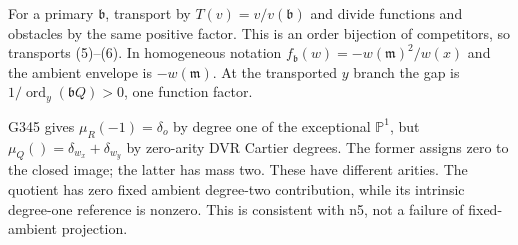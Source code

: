 For a primary $\mathfrak b$, transport by $T(v)=v/v(\mathfrak b)$ and divide functions and obstacles by the same positive factor. This is an order bijection of competitors, so transports (5)--(6). In homogeneous notation $f_{\mathfrak b}(w)=-w(\mathfrak m)^2/w(x)$ and the ambient envelope is $-w(\mathfrak m)$. At the transported $y$ branch the gap is $1/\operatorname{ord}_y(\mathfrak bQ)>0$, one function factor.

G345 gives $\mu_R(-1)=\delta_o$ by degree one of the exceptional $\mathbb P^1$, but $\mu_Q()=\delta_{w_x}+\delta_{w_y}$ by zero-arity DVR Cartier degrees. The former assigns zero to the closed image; the latter has mass two. These have different arities. The quotient has zero fixed ambient degree-two contribution, while its intrinsic degree-one reference is nonzero. This is consistent with n5, not a failure of fixed-ambient projection.
